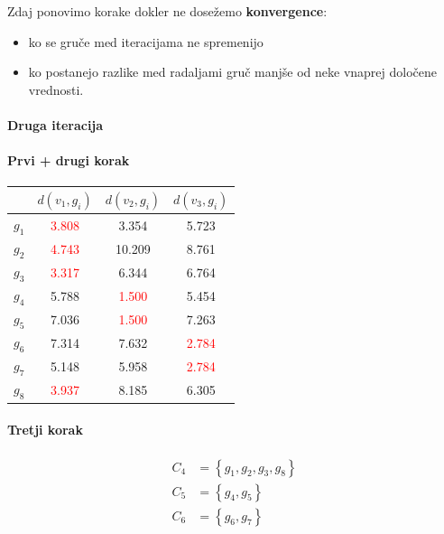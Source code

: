 \documentclass{article}
\begin{document}
\begin{enumerate}
		Zdaj ponovimo korake dokler ne dosežemo \textbf{konvergence}:

		\begin{itemize}
			\item ko se gruče med iteracijama ne spremenijo
			\item ko postanejo razlike med radaljami gruč manjše od neke vnaprej določene vrednosti.
		\end{itemize}

		\paragraph{Druga iteracija}
		\paragraph{Prvi + drugi korak}

		\begin{center}
			\begin{tabular}{c||c|c|c|}
				& $d(v_1, g_i)$ & $d(v_2, g_i)$ & $d(v_3, g_i)$ \\
				\hline
				\hline
				$g_1$ & \textcolor{red}{3.808} & 3.354 & 5.723\\
				\hline
				$g_2$ & \textcolor{red}{4.743} & 10.209 & 8.761\\
				\hline
				$g_3$ & \textcolor{red}{3.317} & 6.344 & 6.764\\
				\hline
				$g_4$ & 5.788 & \textcolor{red}{1.500} & 5.454\\
				\hline
				$g_5$ & 7.036 & \textcolor{red}{1.500} & 7.263\\
				\hline
				$g_6$ & 7.314 & 7.632 & \textcolor{red}{2.784}\\
				\hline
				$g_7$ & 5.148 & 5.958 & \textcolor{red}{2.784}\\
				\hline
				$g_8$ & \textcolor{red}{3.937} & 8.185 & 6.305\\
			\end{tabular}
		\end{center}

		\paragraph{Tretji korak}

		\begin{align*}
			C_4 &= \left\{ g_1, g_2, g_3, g_8 \right\} \\
			C_5 &= \left\{ g_4, g_5 \right\} \\
			C_6 &= \left\{ g_6, g_7 \right\}
		\end{align*}


\end{enumerate}
\end{document}
